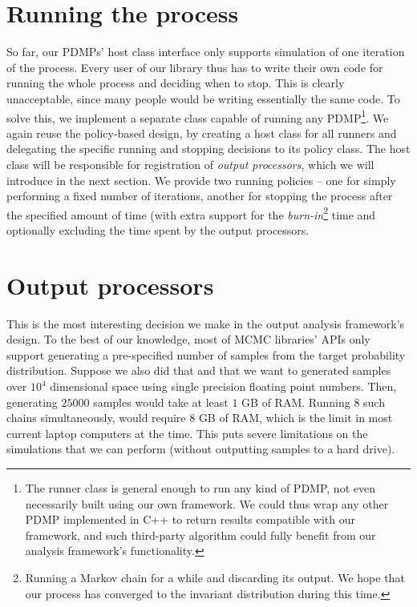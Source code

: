 \documentclass[report.tex]{subfiles}
\begin{document}
\section{Running the process}

So far, our PDMPs' host class interface only supports simulation of one iteration
of the process.
Every user of our library thus has to write their own code for running the whole process
and deciding when to stop. This is clearly unacceptable, since many people would be
writing essentially the same code.
To solve this, we implement a separate class capable of running any PDMP\footnote{
  The runner class is general enough to run any kind of PDMP, not even necessarily built
  using our own framework. We could thus wrap any other PDMP implemented in C++ to return
  results compatible with our framework, and such third-party algorithm could fully benefit
  from our analysis framework's functionality.
}. We again reuse the policy-based design, by creating a host class for all runners
and delegating the specific running and stopping decisions to its policy class.
The host class will be responsible for registration of \textit{output processors}, which we will
introduce in the next section. We provide two running policies -- one for simply
performing a fixed number of iterations, another for stopping the process after
the specified amount of time (with extra support for the
\textit{burn-in}\footnote{Running a Markov chain
for a while and discarding its output. We hope that our process has converged to the invariant distribution
during this time.
} time and optionally excluding the time spent by the output processors.


\section{Output processors}
This is the most interesting decision we make in the output analysis framework's design.
To the best of our knowledge, most of MCMC libraries' APIs only support generating
a pre-specified number of samples from the target probability distribution.
Suppose we also did that and that we want to generated samples over $10^{4}$ dimensional space
using single precision floating point numbers.
Then, generating $25000$ samples would take at least $1$ GB of RAM. Running 8 such
chains simultaneously, would require $8$ GB of RAM, which is the limit in most
current laptop computers at the time. This puts severe limitations on the simulations that we can perform (without
outputting samples to a hard drive).
\end{document}
